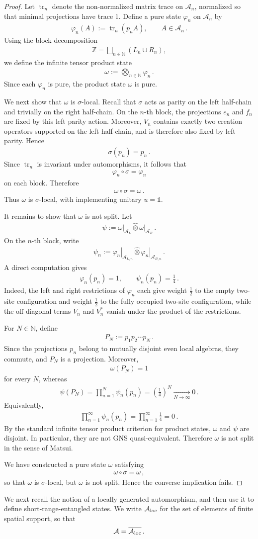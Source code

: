 \documentclass[a4paper,10pt]{article}
\numberwithin{equation}{section}
\theoremstyle{plain}
\theoremstyle{plain}
\theoremstyle{plain}
\theoremstyle{plain}
\theoremstyle{plain}
\theoremstyle{remark}
\theoremstyle{definition}
\newcommand{\ZZ}{\mathbb{Z}}
\newcommand{\NN}{\mathbb{N}}
\newcommand{\calA}{\mathcal{A}}
\newcommand{\tr}{\operatorname{tr}}
\newcommand{\Id}{\mathds{1}}
\newcommand{\eq}[1]{\begin{align*}#1\end{align*}}
\newcommand{\onehalf}{\frac{1}{2}}
\newcommand{\br}[1]{\left(#1\right)}
\begin{document}
\begin{proof}
Let $\tr_n$ denote the non-normalized matrix trace on $\calA_n$, normalized so
that minimal projections have trace $1$. Define a pure state $\varphi_n$ on
$\calA_n$ by
\eq{
    \varphi_n(A):=\tr_n(p_nA),
    \qquad
    A\in\calA_n\,.
}
Using the block decomposition
\eq{
    \ZZ=\bigsqcup_{n\in\NN}\br{L_n\cup R_n},
}
we define the infinite tensor product state
\eq{
    \omega:=\bigotimes_{n\in\NN}\varphi_n\,.
}
Since each $\varphi_n$ is pure, the product state $\omega$ is pure.

We next show that $\omega$ is $\sigma$-local. Recall that $\sigma$ acts as
parity on the left half-chain and trivially on the right half-chain. On the
$n$-th block, the projections $e_n$ and $f_n$ are fixed by this left parity
action. Moreover, $V_n$ contains exactly two creation operators supported on
the left half-chain, and is therefore also fixed by left parity. Hence
\eq{
    \sigma(p_n)=p_n\,.
}
Since $\tr_n$ is invariant under automorphisms, it follows that
\eq{
    \varphi_n\circ\sigma=\varphi_n
}
on each block. Therefore
\eq{
    \omega\circ\sigma=\omega\,.
}
Thus $\omega$ is $\sigma$-local, with implementing unitary $u=\Id$.

It remains to show that $\omega$ is not split. Let
\eq{
    \psi
    :=
    \left.\omega\right|_{\calA_L}
    \hat{\otimes}
    \left.\omega\right|_{\calA_R}\,.
}
On the $n$-th block, write
\eq{
    \psi_n
    :=
    \left.\varphi_n\right|_{\calA_{L,n}}
    \hat{\otimes}
    \left.\varphi_n\right|_{\calA_{R,n}}\,.
}
A direct computation gives
\eq{
    \varphi_n(p_n)=1,
    \qquad
    \psi_n(p_n)=\frac{1}{4}\,.
}
Indeed, the left and right restrictions of $\varphi_n$ each give weight
$\onehalf$ to the empty two-site configuration and weight $\onehalf$ to the
fully occupied two-site configuration, while the off-diagonal terms $V_n$ and
$V_n^*$ vanish under the product of the restrictions.

For $N\in\NN$, define
\eq{
    P_N:=p_1p_2\cdots p_N\,.
}
Since the projections $p_n$ belong to mutually disjoint even local algebras,
they commute, and $P_N$ is a projection. Moreover,
\eq{
    \omega(P_N)=1
}
for every $N$, whereas
\eq{
    \psi(P_N)
    =
    \prod_{n=1}^N\psi_n(p_n)
    =
    \br{\frac{1}{4}}^N
    \xrightarrow[N\to\infty]{}
    0\,.
}
Equivalently,
\eq{
    \prod_{n=1}^{\infty}\psi_n(p_n)
    =
    \prod_{n=1}^{\infty}\frac{1}{4}
    =
    0\,.
}
By the standard infinite tensor product criterion for product states, $\omega$
and $\psi$ are disjoint. In particular, they are not GNS quasi-equivalent.
Therefore $\omega$ is not split in the sense of Matsui.

We have constructed a pure state $\omega$ satisfying
\eq{
    \omega\circ\sigma=\omega\, ,
}
so that $\omega$ is $\sigma$-local, but $\omega$ is not split. Hence the
converse implication fails.
\end{proof}
We next recall the notion of a locally generated automorphism, and then use it
to define short-range-entangled states. We write $\calA_{\rm loc}$ for the set
of elements of finite spatial support, so that
\eq{
    \calA
    =
    \overline{\calA_{\rm loc}}\,.
}
\end{document}
